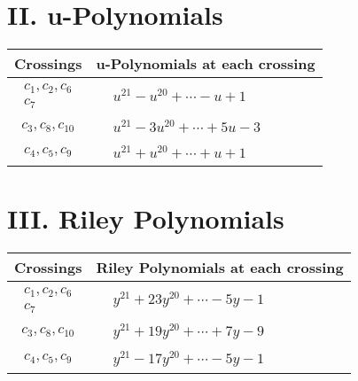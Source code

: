 \documentclass[1p]{elsarticle_modified}
\theoremstyle{definition}
\begin{document}
\newpage\renewcommand{\arraystretch}{1}
\centering \section*{ II. u-Polynomials}
\begin{tabular}{m{50pt}|m{274pt}}
Crossings & \hspace{64pt}u-Polynomials at each crossing \\
\hline $$\begin{aligned}c_{1},c_{2},c_{6}\\c_{7}\end{aligned}$$&$\begin{aligned}
&u^{21}- u^{20}+\cdots- u+1
\end{aligned}$\\
\hline $$\begin{aligned}c_{3},c_{8},c_{10}\end{aligned}$$&$\begin{aligned}
&u^{21}-3 u^{20}+\cdots+5 u-3
\end{aligned}$\\
\hline $$\begin{aligned}c_{4},c_{5},c_{9}\end{aligned}$$&$\begin{aligned}
&u^{21}+u^{20}+\cdots+u+1
\end{aligned}$\\
\hline
\end{tabular}\newpage\renewcommand{\arraystretch}{1}
\centering \section*{ III. Riley Polynomials}
\begin{tabular}{m{50pt}|m{274pt}}
Crossings & \hspace{64pt}Riley Polynomials at each crossing \\
\hline $$\begin{aligned}c_{1},c_{2},c_{6}\\c_{7}\end{aligned}$$&$\begin{aligned}
&y^{21}+23 y^{20}+\cdots-5 y-1
\end{aligned}$\\
\hline $$\begin{aligned}c_{3},c_{8},c_{10}\end{aligned}$$&$\begin{aligned}
&y^{21}+19 y^{20}+\cdots+7 y-9
\end{aligned}$\\
\hline $$\begin{aligned}c_{4},c_{5},c_{9}\end{aligned}$$&$\begin{aligned}
&y^{21}-17 y^{20}+\cdots-5 y-1
\end{aligned}$\\
\hline
\end{tabular}
\vskip 2pc
\end{document}

